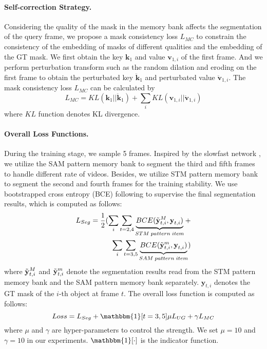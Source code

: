 \documentclass[10pt,twocolumn,letterpaper]{article}
\begin{document}
\paragraph{Self-correction Strategy.}
Considering the quality of the mask in the memory bank affects the segmentation of the query frame, we propose a mask consistency loss $L_{MC}$  to constrain the consistency of the embedding of masks of different qualities and the embedding of the GT mask.  
We first obtain the key $\textbf{k}_{1}$ and value $\textbf{v}_{1,i}$ of the first frame. And we perform perturbation transform such as the random dilation and eroding on the first frame to obtain the perturbated key $\ddot{\textbf{k}}_{1}$ and perturbated value $\ddot{\textbf{v}}_{1,i}$. The mask consistency loss $L_{MC}$ can be calculated by 
\begin{equation}
L_{MC} = KL (\textbf{k}_{1} || \ddot{\textbf{k}}_{1}) + \sum_i  KL (\textbf{v}_{1,i}|| \ddot{\textbf{v}}_{1,i})
\end{equation}
where $KL$ function denotes KL divergence. 


\paragraph{Overall Loss Functions.}
During the training stage, we sample 5 frames. Inspired by the slowfast network \cite{feichtenhofer2019slowfast}, we utilize the SAM pattern memory bank to segment the third and fifth frames to handle different rate of videos. Besides, we utilize STM pattern memory bank to segment the second and fourth frames for the training stability.  We use bootstrapped cross entropy (BCE) following \cite{cheng2021modular} to supervise the final segmentation results, which is computed as follows:
\begin{equation}
\begin{split}
L_{Seg} = \frac{1}{2} (\sum_i \sum_{t=2,4} \underbrace{BCE(\Tilde{\textbf{y}}^{M}_{t,i}, \textbf{y}_{t,i})}_{STM  \; pattern \; item} +  \\
\sum_i \sum_{t=3,5} \underbrace{BCE(\Tilde{\textbf{y}}^{m}_{t,i}, \textbf{y}_{t,i})}_{SAM  \;  pattern \; item})
\label{eq:segloss}
\end{split}
\end{equation}
where $\Tilde{\textbf{y}}^{M}_{t,i}$ and $\Tilde{\textbf{y}}^{m}_{t,i}$ denote the segmentation results read from the STM pattern memory bank and the SAM pattern memory bank separately. $\textbf{y}_{t,i}$ denotes the GT mask of the $i$-th object at frame $t$. The overall loss function is computed as follows:
\begin{equation}
Loss = L_{Seg} +\mathbbm{1}[t=3,5] \mu L_{UG} + \gamma L_{MC}
\label{eq:loss}
\end{equation}
where $\mu$ and $\gamma$ are hyper-parameters to control the strength. We set $\mu=10$ and $\gamma=10$ in our experiments. $\mathbbm{1}[\cdot]$ is the indicator function.
\end{document}
